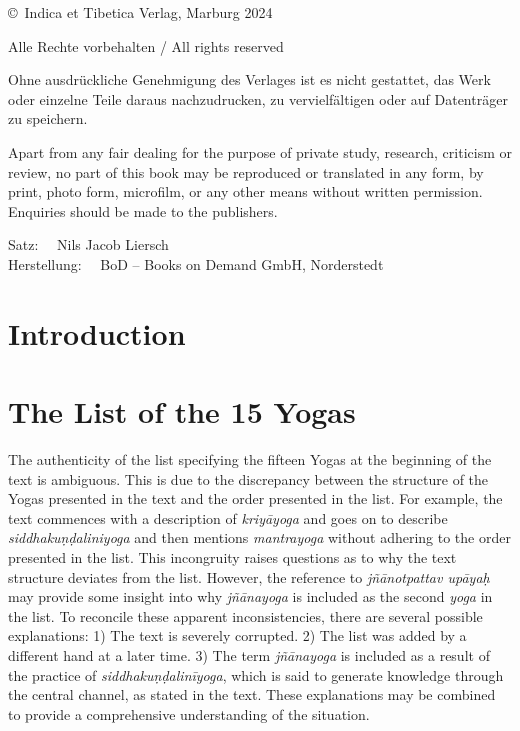 \vskip 1cm

\noindent
\copyright\ Indica et Tibetica Verlag, Marburg 2024

\medskip

\noindent
Alle Rechte vorbehalten / All rights reserved

\medskip

\noindent
Ohne ausdrückliche Genehmigung des Verlages ist es nicht gestattet, das Werk oder einzelne Teile
daraus nachzudrucken, zu vervielfältigen oder auf Datenträger zu speichern.

\smallskip

\noindent
Apart from any fair dealing for the purpose of private study, research, criticism or review, no
part of this book may be reproduced or translated in any form, by print, photo form, microfilm, or
any other means without written permission. Enquiries should be made to the publishers.

\bigskip

\noindent
Satz: \ \ Nils Jacob Liersch \\
Herstellung: \ \ BoD – Books on Demand GmbH, Norderstedt  \\

\bigskip

\noindent

\normalsize

\newpage

\clearpage
\tableofcontents
\addtocounter{page}{-1}
\thispagestyle{empty}
\clearpage

\chapter{Introduction}
\mainmatter

\chapter{The List of the 15 Yogas}
\label{yogas_list}
The authenticity of the list specifying the fifteen Yogas at the beginning of the text is ambiguous. This is due to the discrepancy between the structure of the Yogas presented in the text and the order presented in the list. For example, the text commences with a description of \textit{kriyāyoga} and goes on to describe \textit{siddhakuṇḍaliniyoga} and then mentions \textit{mantrayoga} without adhering to the order presented in the list. This incongruity raises questions as to why the text structure deviates from the list. However, the reference to \textit{jñānotpattav upāyaḥ} may provide some insight into why \textit{jñānayoga} is included as the second \textit{yoga} in the list. To reconcile these apparent inconsistencies, there are several possible explanations: 1) The text is severely corrupted. 2) The list was added by a different hand at a later time. 3) The term \textit{jñānayoga} is included as a result of the practice of \textit{siddhakuṇḍalinīyoga}, which is said to generate knowledge through the central channel, as stated in the text. These explanations may be combined to provide a comprehensive understanding of the situation.

